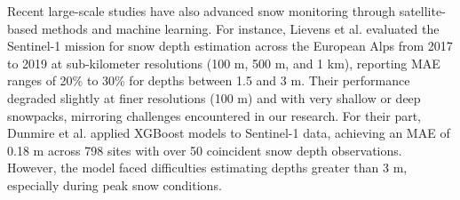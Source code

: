 \documentclass[preprint,12pt]{elsarticle}
\begin{document}
{%

Recent large-scale studies have also advanced snow monitoring through satellite-based methods and machine learning. For instance, Lievens et al. \cite{lievens2022sentinel} evaluated the Sentinel-1 mission for snow depth estimation across the European Alps from 2017 to 2019 at sub-kilometer resolutions (100 m, 500 m, and 1 km), reporting MAE ranges of 20\% to 30\% for depths between 1.5 and 3 m. Their performance degraded slightly at finer resolutions (100 m) and with very shallow or deep snowpacks, mirroring challenges encountered in our research. For their part, Dunmire et al. \cite{dunmire2024machine} applied XGBoost models to Sentinel-1 data, achieving an MAE of 0.18 m across 798 sites with over 50 coincident snow depth observations. However, the model faced difficulties estimating depths greater than 3 m, especially during peak snow conditions.


}
\end{document}
